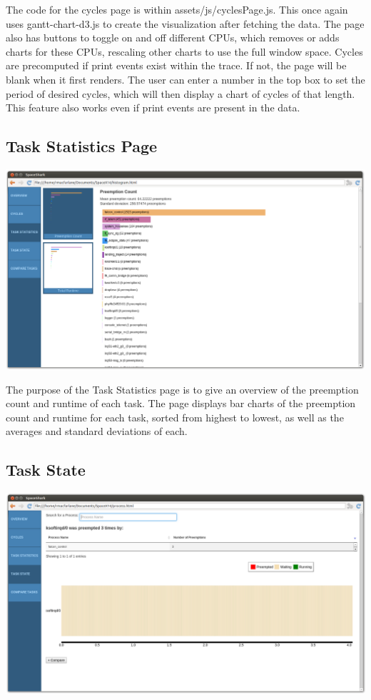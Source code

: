 \documentclass{hmcclinic}
\begin{document}
    The code for the cycles page is within assets/js/cyclesPage.js. This once again
    uses gantt-chart-d3.js to create the visualization after fetching the data.
    The page also has buttons to toggle on and off different CPUs, which removes
    or adds charts for these CPUs, rescaling other charts to use the full window
    space. Cycles are precomputed if print events exist within the trace. If
    not, the page will be blank when it first renders. The user can enter a
    number in the top box to set the period of desired cycles, which will then
    display a chart of cycles of that length. This feature also works even if
    print events are present in the data.
  
  \subsection{Task Statistics Page} %

  \includegraphics[scale=0.25]{task-statistics-page.png}

The purpose of the Task Statistics page is to give an overview of the preemption count and runtime of each task. The page displays bar charts of the preemption count and runtime for each task, sorted from highest to lowest, as well as the averages and standard deviations of each.

  \subsection{Task State}

  \includegraphics[scale=0.25]{task-state-page.png}
  
\end{document}
